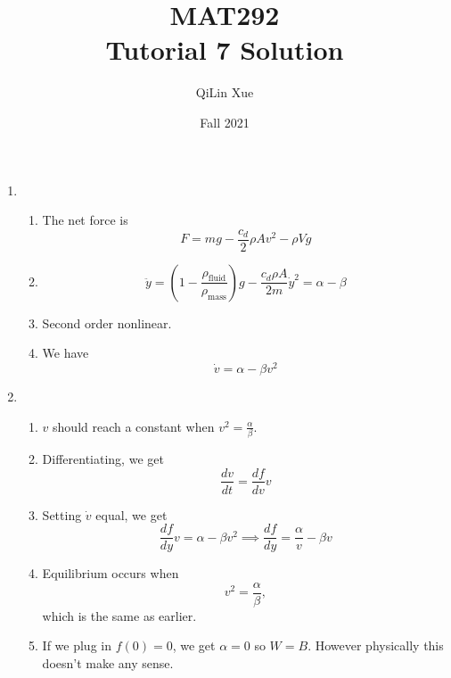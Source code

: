\documentclass{article}
\title{MAT292 \\ Tutorial 7 Solution}
\author{QiLin Xue}
\date{Fall 2021}
\begin{document}
\newcommand{\tabitem}{~~\llap{\textbullet}~~}

\maketitle
\begin{enumerate}
    \item \begin{enumerate}[label=(\alph*)]
        \item The net force is
        \begin{equation}
            F = mg - \frac{c_d}{2}\rho Av^2 - \rho Vg
        \end{equation}
        \item 
        \begin{equation}
            \ddot{y} = \left(1-\frac{\rho_\text{fluid}}{\rho_\text{mass}}\right)g - \frac{c_d\rho A}{2m}\dot{y}^2 = \alpha - \beta 
        \end{equation}
        \item Second order nonlinear.
        \item We have 
        \begin{equation}
            \dot{v} = \alpha - \beta v^2
        \end{equation}
    \end{enumerate}
    \item \begin{enumerate}[label=(\alph*)]
        \item $v$ should reach a constant when $v^2 = \frac{\alpha}{\beta}.$
        \item Differentiating, we get
        \begin{equation}
            \frac{dv}{dt} = \frac{df}{dv}v
        \end{equation}
        \item Setting $\dot{v}$ equal, we get
        \begin{equation}
            \frac{df}{dy}v = \alpha - \beta v^2 \implies \frac{df}{dy} = \frac{\alpha}{v} - \beta v 
        \end{equation}
        \item Equilibrium occurs when 
        \begin{equation}
            v^2 = \frac{\alpha}{\beta},
        \end{equation}
        which is the same as earlier.
        \item If we plug in $f(0)=0$, we get $\alpha=0$ so $W=B.$ However physically this doesn't make any sense. 

\end{enumerate}
\end{enumerate}
\end{document}
